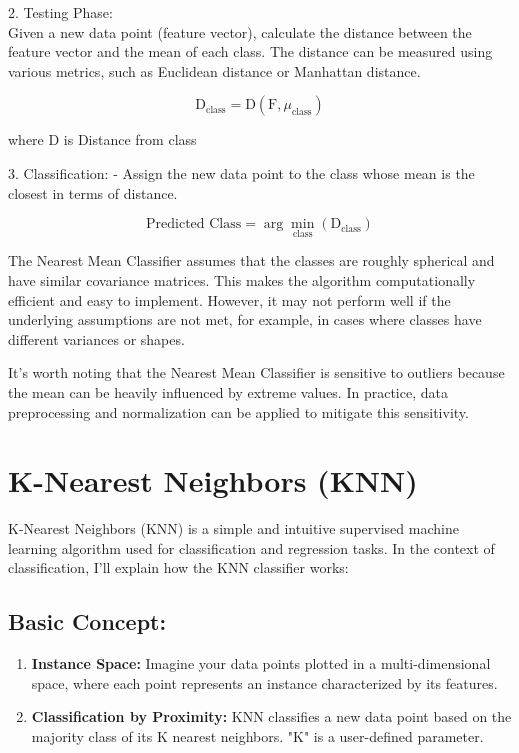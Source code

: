 \documentclass[9pt,twocolumn]{paper-template}
\begin{document}
2. Testing Phase:\\
Given a new data point (feature vector), calculate the distance between the feature vector and the mean of each class. The distance can be measured using various metrics, such as Euclidean distance or Manhattan distance.

\[ \text{D}_{\text{class}} = \text{D}(\text{F}, \mu_{\text{class}}) \]

where D is Distance from class

3. Classification:
- Assign the new data point to the class whose mean is the closest in terms of distance.

\[ \text{Predicted Class} = \arg\min_{\text{class}} \left(\text{D}_{\text{class}}\right) \]

The Nearest Mean Classifier assumes that the classes are roughly spherical and have similar covariance matrices. This makes the algorithm computationally efficient and easy to implement. However, it may not perform well if the underlying assumptions are not met, for example, in cases where classes have different variances or shapes.

It's worth noting that the Nearest Mean Classifier is sensitive to outliers because the mean can be heavily influenced by extreme values. In practice, data preprocessing and normalization can be applied to mitigate this sensitivity.






\section*{K-Nearest Neighbors (KNN)}

K-Nearest Neighbors (KNN) is a simple and intuitive supervised machine learning algorithm used for classification and regression tasks. In the context of classification, I'll explain how the KNN classifier works:

\subsection*{Basic Concept:}
\begin{enumerate}
	\item \textbf{Instance Space:} Imagine your data points plotted in a multi-dimensional space, where each point represents an instance characterized by its features.
	
	\item \textbf{Classification by Proximity:} KNN classifies a new data point based on the majority class of its K nearest neighbors. "K" is a user-defined parameter.
\end{enumerate}
\end{document}
